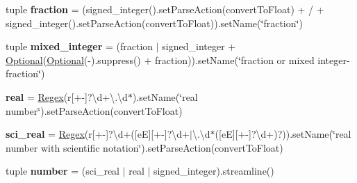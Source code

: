 \begin{DoxyCompactItemize}
tuple {\bfseries fraction} = (signed\+\_\+integer().set\+Parse\+Action(convert\+To\+Float) + \textquotesingle{}/\textquotesingle{} + signed\+\_\+integer().set\+Parse\+Action(convert\+To\+Float)).set\+Name(\char`\"{}fraction\char`\"{})
\item 
\mbox{\label{classpkg__resources_1_1__vendor_1_1pyparsing_1_1pyparsing__common_ac0f718de3e1927c431618f647cea09a8}} 
tuple {\bfseries mixed\+\_\+integer} = (fraction $\vert$ signed\+\_\+integer + \hyperlink{classpkg__resources_1_1__vendor_1_1pyparsing_1_1_optional}{Optional}(\hyperlink{classpkg__resources_1_1__vendor_1_1pyparsing_1_1_optional}{Optional}(\textquotesingle{}-\/\textquotesingle{}).suppress() + fraction)).set\+Name(\char`\"{}fraction or mixed integer-\/fraction\char`\"{})
\item 
\mbox{\label{classpkg__resources_1_1__vendor_1_1pyparsing_1_1pyparsing__common_afa401259f725e43fb435523cfae3f730}} 
{\bfseries real} = \hyperlink{classpkg__resources_1_1__vendor_1_1pyparsing_1_1_regex}{Regex}(r\textquotesingle{}\mbox{[}+-\/\mbox{]}?\textbackslash{}d+\textbackslash{}.\textbackslash{}d$\ast$\textquotesingle{}).set\+Name(\char`\"{}real number\char`\"{}).set\+Parse\+Action(convert\+To\+Float)
\item 
\mbox{\label{classpkg__resources_1_1__vendor_1_1pyparsing_1_1pyparsing__common_a9b7b8c18d8e7b9e9234eb80820eb3b2e}} 
{\bfseries sci\+\_\+real} = \hyperlink{classpkg__resources_1_1__vendor_1_1pyparsing_1_1_regex}{Regex}(r\textquotesingle{}\mbox{[}+-\/\mbox{]}?\textbackslash{}d+(\mbox{[}eE\mbox{]}\mbox{[}+-\/\mbox{]}?\textbackslash{}d+$\vert$\textbackslash{}.\textbackslash{}d$\ast$(\mbox{[}eE\mbox{]}\mbox{[}+-\/\mbox{]}?\textbackslash{}d+)?)\textquotesingle{}).set\+Name(\char`\"{}real number with scientific notation\char`\"{}).set\+Parse\+Action(convert\+To\+Float)
\item 
\mbox{\label{classpkg__resources_1_1__vendor_1_1pyparsing_1_1pyparsing__common_a27c2be2d6c960ddf0399abe36826d753}} 
tuple {\bfseries number} = (sci\+\_\+real $\vert$ real $\vert$ signed\+\_\+integer).streamline()
\item 

\end{DoxyCompactItemize}
